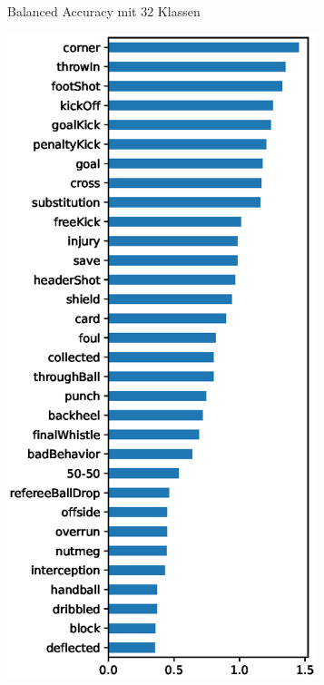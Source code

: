 \begin{figure}
\begin{subfigure}{.24\textwidth}
        \caption{Balanced Accuracy \newline mit 32 Klassen}
        \label{fig:ba_by_class}
    \end{subfigure}%
    \begin{subfigure}{.24\textwidth}
        \centering
        \includegraphics[width=0.99\textwidth, keepaspectratio, interpolate]{img/07_pca_by_class_ph_2.eps}

\end{subfigure}
\end{figure}
